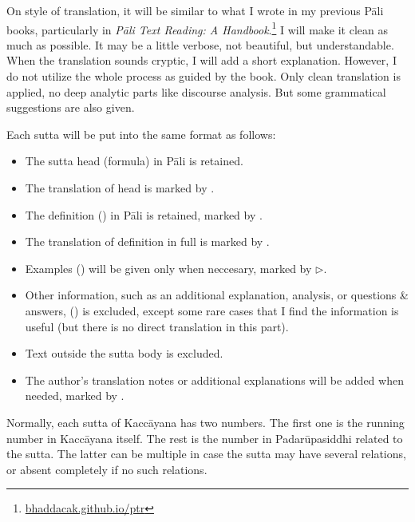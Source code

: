 On style of translation, it will be similar to what I wrote in my previous Pāli books, particularly in \emph{Pāli Text Reading: A Handbook}.\footnote{\url{bhaddacak.github.io/ptr}} I will make it clean as much as possible. It may be a little verbose, not beautiful, but understandable. When the translation sounds cryptic, I will add a short explanation. However, I do not utilize the whole process as guided by the book. Only clean translation is applied, no deep analytic parts like discourse analysis. But some grammatical suggestions are also given.

Each sutta will be put into the same format as follows:

\begin{itemize}
\item The sutta head (formula) in Pāli is retained.
\item The translation of head is marked by \faHeart[regular].
\item The definition () in Pāli is retained, marked by \faAngleRight.
\item The translation of definition in full is marked by \faAngleDoubleRight.
\item Examples () will be given only when neccesary, marked by $\triangleright$.
\item Other information, such as an additional explanation, analysis, or questions \& answers, () is excluded, except some rare cases that I find the information is useful (but there is no direct translation in this part).
\item Text outside the sutta body is excluded.
\item The author's translation notes or additional explanations will be added when needed, marked by \faLightbulb[regular].
\end{itemize}

Normally, each sutta of Kaccāyana has two numbers. The first one is the running number in Kaccāyana itself. The rest is the number in Padarūpasiddhi related to the sutta. The latter can be multiple in case the sutta may have several relations, or absent completely if no such relations.
